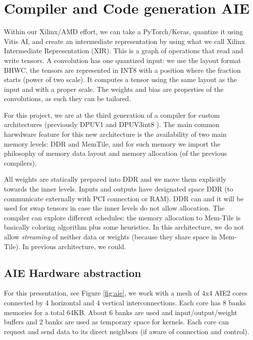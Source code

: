 \documentclass[conference]{IEEEtran}
\begin{document}
\section{Compiler and Code generation AIE}
\label{sec:compiler}
Within our Xilinx/AMD effort, we can take a PyTorch/Keras, quantize it
using Vitis AI, and create an intermediate representation by using
what we call Xilinx Intermediate Representation (XIR). This is a graph
of operations that read and write tensors. A convolution has one
quantized input: we use the layout format BHWC, the tensors are
represented in INT8 with a position where the fraction starts (power
of two scale). It computes a tensor using the same layout as the input
and with a proper scale. The weights and bias are properties of the
convolutions, as such they can be tailored.

For this project, we are at the third generation of a compiler for
custom architectures (previously DPUV1 and DPUV3int8
\cite{10.1145/3473334,abs-2110-04327}). The main common harwdware
feature for this new architecture is the availability of two main
memory levels: DDR and MemTile, and for such memory we import the
philosophy of memory data layout and memory allocation (of the
previous compilers).

All weights are statically prepared into DDR and we move them
explicitly towards the inner levels. Inputs and outputs have
designated space DDR (to communicate externally with PCI connection or
RAM). DDR can and it will be used for swap tensors in case the inner
levels do not allow allocation.  The compiler can explore different
schedules: the memory allocation to Mem-Tile is basically coloring
algorithm plus some heuristics. In this architecture, we do not allow
{\em streaming} of neither data or weights (because they share space
in Mem-Tile). In previous architecture, we could.

\subsection{AIE Hardware abstraction}


For this presentation, see Figure \ref{fig:aie}, we work with a mesh
of 4x4 AIE2 cores connected by 4 horizontal and 4 vertical
interconnections. Each core has 8 banks memories for a total
64KB. About 6 banks are used and input/output/weight buffers and 2
banks are used as temporary space for kernels. Each core can request
and send data to its direct neighbors (if aware of connection and
control).
\end{document}
